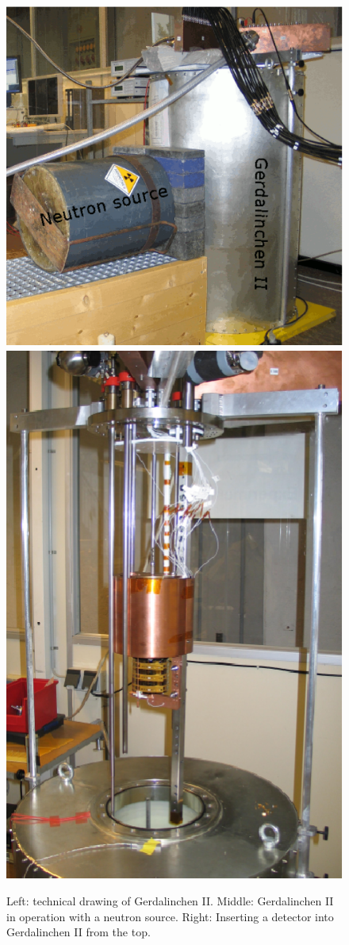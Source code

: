 \begin{figure}[tbhp]
  \includegraphics[height=0.25\textheight]{GIIneutron}\hfil
  \includegraphics[height=0.25\textheight]{GIIdet}
  \caption{Left: technical drawing of Gerdalinchen II. Middle:     Gerdalinchen II in operation with a neutron source. Right:     Inserting a detector into Gerdalinchen II from the top.}
  \label{fig:tt:gii}
\end{figure}


